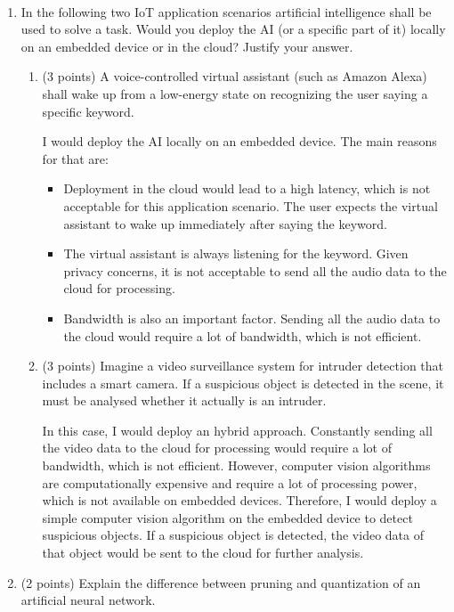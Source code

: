 \documentclass[12pt]{article}
\begin{document}
    \newpage

    \begin{ejercicio}[11 points]
        ~
        \begin{enumerate}[label=\alph*)]
            \item In the following two IoT application scenarios artificial intelligence shall be used to solve a task. Would you deploy the AI (or a specific part of it) locally on an embedded device or in the cloud? Justify your answer.
            \begin{enumerate}[label=\roman*)]
                \item (3 points) A voice-controlled virtual assistant (such as Amazon Alexa) shall wake up from a low-energy state on recognizing the user saying a specific keyword.
                
                I would deploy the AI locally on an embedded device. The main reasons for that are:
                \begin{itemize}
                    \item Deployment in the cloud would lead to a high latency, which is not acceptable for this application scenario. The user expects the virtual assistant to wake up immediately after saying the keyword.
                    \item The virtual assistant is always listening for the keyword. Given privacy concerns, it is not acceptable to send all the audio data to the cloud for processing.
                    \item Bandwidth is also an important factor. Sending all the audio data to the cloud would require a lot of bandwidth, which is not efficient.
                \end{itemize}
                \item (3 points) Imagine a video surveillance system for intruder detection that includes a smart camera. If a suspicious object is detected in the scene, it must be analysed whether it actually is an intruder.
                
                In this case, I would deploy an hybrid approach. Constantly sending all the video data to the cloud for processing would require a lot of bandwidth, which is not efficient. However, computer vision algorithms are computationally expensive and require a lot of processing power, which is not available on embedded devices. Therefore, I would deploy a simple computer vision algorithm on the embedded device to detect suspicious objects. If a suspicious object is detected, the video data of that object would be sent to the cloud for further analysis.
            \end{enumerate}
            \item (2 points) Explain the difference between pruning and quantization of an artificial neural network.
            

\end{enumerate}
\end{ejercicio}
\end{document}
